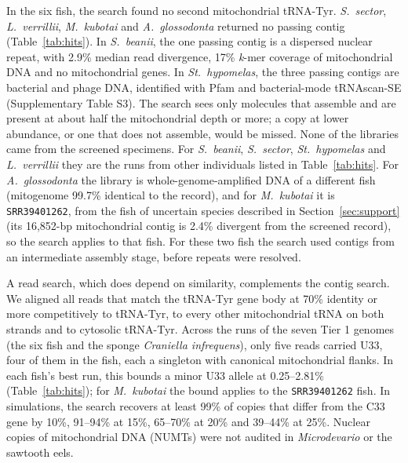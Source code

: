 \documentclass[11pt, a4paper]{article}
\begin{document}
In the six fish, the search found no second mitochondrial tRNA-Tyr. \textit{S.\ sector}, \textit{L.\ verrillii}, \textit{M.\ kubotai} and \textit{A.\ glossodonta} returned no passing contig (Table~\ref{tab:hits}). In \textit{S.\ beanii}, the one passing contig is a dispersed nuclear repeat, with 2.9\% median read divergence, 17\% \textit{k}-mer coverage of mitochondrial DNA and no mitochondrial genes. In \textit{St.\ hypomelas}, the three passing contigs are bacterial and phage DNA, identified with Pfam and bacterial-mode tRNAscan-SE (Supplementary Table S3). The search sees only molecules that assemble and are present at about half the mitochondrial depth or more; a copy at lower abundance, or one that does not assemble, would be missed. None of the libraries came from the screened specimens. For \textit{S.\ beanii}, \textit{S.\ sector}, \textit{St.\ hypomelas} and \textit{L.\ verrillii} they are the runs from other individuals listed in Table~\ref{tab:hits}. For \textit{A.\ glossodonta} the library is whole-genome-amplified DNA of a different fish (mitogenome 99.7\% identical to the record), and for \textit{M.\ kubotai} it is \texttt{SRR39401262}, from the fish of uncertain species described in Section~\ref{sec:support} (its 16,852-bp mitochondrial contig is 2.4\% divergent from the screened record), so the search applies to that fish. For these two fish the search used contigs from an intermediate assembly stage, before repeats were resolved.

A read search, which does depend on similarity, complements the contig search. We aligned all reads that match the tRNA-Tyr gene body at 70\% identity or more competitively to tRNA-Tyr, to every other mitochondrial tRNA on both strands and to cytosolic tRNA-Tyr. Across the runs of the seven Tier 1 genomes (the six fish and the sponge \textit{Craniella infrequens}), only five reads carried U33, four of them in the fish, each a singleton with canonical mitochondrial flanks. In each fish's best run, this bounds a minor U33 allele at 0.25--2.81\% (Table~\ref{tab:hits}); for \textit{M.\ kubotai} the bound applies to the \texttt{SRR39401262} fish. In simulations, the search recovers at least 99\% of copies that differ from the C33 gene by 10\%, 91--94\% at 15\%, 65--70\% at 20\% and 39--44\% at 25\%. Nuclear copies of mitochondrial DNA (NUMTs) were not audited in \textit{Microdevario} or the sawtooth eels.
\end{document}
